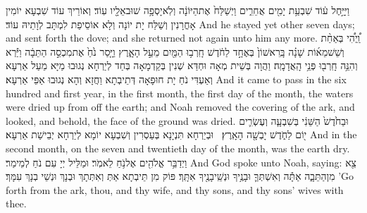 {וַיִּיָּ֣חֶל ע֔וֹד שִׁבְעַ֥ת יָמִ֖ים אֲחֵרִ֑ים וַיְשַׁלַּח֙ אֶת\maqqaf הַיּוֹנָ֔ה וְלֹֽא\maqqaf יָסְפָ֥ה שׁוּב\maqqaf אֵלָ֖יו עֽוֹד׃}
{וְאוֹרֵיךְ עוֹד שִׁבְעָא יוֹמִין אָחֳרָנִין וְשַׁלַּח יָת יוֹנָה וְלָא אוֹסֵיפַת לִמְתָּב לְוָתֵיהּ עוֹד׃}
{And he stayed yet other seven days; and sent forth the dove; and she returned not again unto him any more.}{}
{וַֽ֠יְהִ֠י בְּאַחַ֨ת וְשֵׁשׁ\maqqaf מֵא֜וֹת שָׁנָ֗ה בָּֽרִאשׁוֹן֙ בְּאֶחָ֣ד לַחֹ֔דֶשׁ חָֽרְב֥וּ הַמַּ֖יִם מֵעַ֣ל הָאָ֑רֶץ וַיָּ֤סַר נֹ֙חַ֙ אֶת\maqqaf מִכְסֵ֣ה הַתֵּבָ֔ה וַיַּ֕רְא וְהִנֵּ֥ה חָֽרְב֖וּ פְּנֵ֥י הָֽאֲדָמָֽה׃}
{וַהֲוָה בְּשֵׁית מְאָה וּחְדַּא שְׁנִין בְּקַדְמָאָה בְּחַד לְיַרְחָא נְגוּבוּ מַיָּא מֵעַל אַרְעָא וְאַעְדִּי נֹחַ יָת חוּפָאָה דְּתֵיבְתָא וַחֲזָא וְהָא נְגוּבוּ אַפֵּי אַרְעָא׃}
{And it came to pass in the six hundred and first year, in the first month, the first day of the month, the waters were dried up from off the earth; and Noah removed the covering of the ark, and looked, and behold, the face of the ground was dried.}{}
{וּבַחֹ֙דֶשׁ֙ הַשֵּׁנִ֔י בְּשִׁבְעָ֧ה וְעֶשְׂרִ֛ים י֖וֹם לַחֹ֑דֶשׁ יָבְשָׁ֖ה הָאָֽרֶץ׃ \setuma }
{וּבְיַרְחָא תִּנְיָנָא בְּעַסְרִין וְשִׁבְעָא יוֹמָא לְיַרְחָא יְבֵישַׁת אַרְעָא׃}
{And in the second month, on the seven and twentieth day of the month, was the earth dry.}{}
{וַיְדַבֵּ֥ר אֱלֹהִ֖ים אֶל\maqqaf נֹ֥חַ לֵאמֹֽר׃}
{וּמַלֵּיל יְיָ עִם נֹחַ לְמֵימַר׃}
{And God spoke unto Noah, saying:}{}
{צֵ֖א מִן\maqqaf הַתֵּבָ֑ה אַתָּ֕ה וְאִשְׁתְּךָ֛ וּבָנֶ֥יךָ וּנְשֵֽׁי\maqqaf בָנֶ֖יךָ אִתָּֽךְ׃}
{פּוֹק מִן תֵּיבְתָא אַתְּ וְאִתְּתָךְ וּבְנָךְ וּנְשֵׁי בְנָךְ עִמָּךְ׃}
{’Go forth from the ark, thou, and thy wife, and thy sons, and thy sons’  wives with thee.}{}
